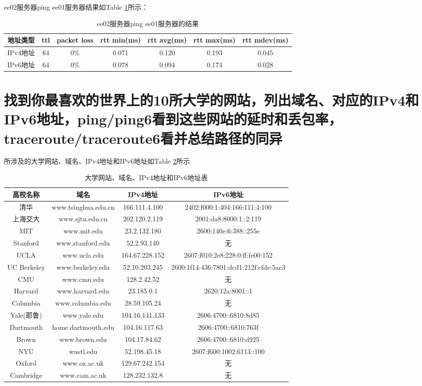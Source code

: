 \documentclass[12pt,letterpaper]{article}
\begin{document}
ee02服务器ping ee01服务器结果如Table \ref{tab3}所示：
\begin{table}[!h]
	\centering
	\caption{\label{tab3}ee02服务器ping ee01服务器的结果}
	\begin{tabular}{|c|c|c|c|c|c|c|}
		\hline
		地址类型 & ttl & packet loss & rtt min(ms) & rtt avg(ms) & rtt max(ms) & rtt mdev(ms) \\
		\hline
		IPv4地址 & 64 & 0\% & 0.071 & 0.120 & 0.193 & 0.045\\
		\hline
		IPv6地址 & 64 & 0\% & 0.078 & 0.094 & 0.174 & 0.028\\
		\hline
	\end{tabular}
\end{table}

\section{找到你最喜欢的世界上的10所大学的网站，列出域名、对应的IPv4和IPv6地址，ping/ping6看到这些网站的延时和丢包率，traceroute/traceroute6看并总结路径的同异}
所涉及的大学网站、域名、IPv4地址和IPv6地址如Table \ref{tab6}所示
\begin{table}[!h]
	\centering
	\caption{\label{tab6}大学网站、域名、IPv4地址和IPv6地址表}
	\begin{tabular}{|c|c|c|c|}
		\hline
		高校名称 & 域名 & IPv4地址 & IPv6地址 \\
		\hline
		清华 & www.tsinghua.edu.cn & 166.111.4.100 & 2402:f000:1:404:166:111:4:100 \\
		\hline
		上海交大 & www.sjtu.edu.cn & 202.120.2.119 & 2001:da8:8000:1::2:119 \\
		\hline
		MIT & www.mit.edu & 23.2.132.180 & 2600:140e:6:388::255e \\
		\hline
		Stanford & www.stanford.edu & 52.2.93.140 & 无  \\
		\hline
		UCLA & www.ucla.edu & 164.67.228.152 & 2607:f010:2e8:228:0:ff:fe00:152 \\
		\hline
		UC Berkeley & www.berkeley.edu & 52.10.203.245 & 2600:1f14:436:7801:dcd1:212f:cfde:5ac3  \\
		\hline
		CMU & www.cmu.edu & 128.2.42.52 & 无 \\
		\hline
		Harvard & www.harvard.edu & 23.185.0.1 & 2620:12a:8001::1 \\
		\hline
		Columbia & www.columbia.edu & 28.59.105.24 & 无 \\
		\hline
		Yale(耶鲁) & www.yale.edu & 104.16.141.133 &2606:4700::6810:8d85 \\
		\hline
		Dartmouth & home.dartmouth.edu & 104.16.117.63 & 2606:4700::6810:763f \\
		\hline
		Brown & www.brown.edu & 104.17.84.62 & 2606:4700::6810:d925 \\
		\hline
		NYU & wustl.edu & 52.198.45.18 & 2607:f600:1002:6113::100 \\
		\hline
		Oxford & www.ox.ac.uk & 129.67.242.154 & 无 \\
		\hline
		Cambridge & www.cam.ac.uk & 128.232.132.8 & 无 \\
		\hline
	\end{tabular}
\end{table}
\end{document}
